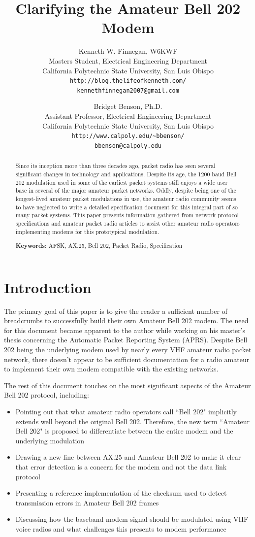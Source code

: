\documentclass[12pt,letterpaper]{article}
\title{Clarifying the Amateur Bell 202 Modem}
\author{Kenneth W. Finnegan, W6KWF\\
\small Masters Student, Electrical Engineering Department\\
\small California Polytechnic State University, San Luis Obispo\\
\small \texttt{http://blog.thelifeofkenneth.com/}\\
\small \texttt{kennethfinnegan2007@gmail.com}\\
\and
Bridget Benson, Ph.D.\\
\small Assistant Professor, Electrical Engineering Department\\
\small California Polytechnic State University, San Luis Obispo\\
\small \texttt{http://www.calpoly.edu/\textasciitilde{}bbenson/}\\
\small \texttt{bbenson@calpoly.edu}}
\begin{document}
\maketitle

\begin{abstract}
	Since its inception more than three decades ago, 
	packet radio has seen several significant changes in technology
	and applications. 
	Despite its age, the 1200 baud Bell 202 modulation used in some
	of the earliest packet systems still enjoys a wide user base
	in several of the major amateur packet networks.
	Oddly, despite being one of the longest-lived amateur packet modulations in use,
	the amateur radio community seems to have neglected to write a detailed
	specification document for this integral part of so many packet systems.
	This paper presents information gathered from network protocol
	specifications and amateur packet radio articles 
	to assist other amateur radio operators implementing modems for 
	this prototypical modulation.
	
	
	\textbf{Keywords:} AFSK, AX.25, Bell 202, Packet Radio, Specification
\end{abstract}

\section{Introduction}

The primary goal of this paper is to give the reader
a sufficient number of breadcrumbs to successfully build their own Amateur
Bell 202 modem.
The need for this document became apparent to the author while working on his
master's thesis concerning the Automatic Packet Reporting System (APRS).
Despite Bell 202 being the underlying modem used by 
nearly every VHF amateur radio packet network, 
there doesn't appear to be sufficient documentation
for a radio amateur to implement their
own modem compatible with the existing networks.

The rest of this document touches on the most significant aspects of the
Amateur Bell 202 protocol, including:
\begin{itemize}
	\item Pointing out that what amateur radio operators call ``Bell 202"
		implicitly extends well beyond the original Bell 202. 
		Therefore, the new term ``Amateur Bell 202"
		is proposed to differentiate between the entire modem and the 
		underlying modulation
	\item Drawing a new line between AX.25 and Amateur Bell 202 to make it clear
		that error detection is a concern for the modem and not the 
		data link protocol
	\item Presenting a reference implementation of the checksum used
		to detect transmission errors in Amateur Bell 202 frames
	\item Discussing how the baseband modem signal should be modulated using
		VHF voice radios and what challenges this presents
		to modem performance
\end{itemize}
\end{document}
